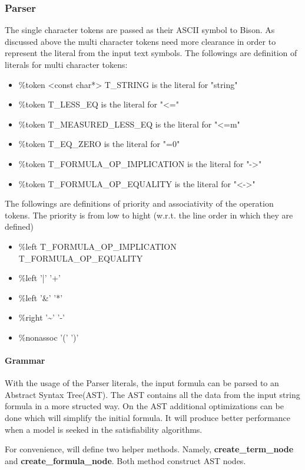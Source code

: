 \documentclass{article}
\begin{document}
	\subsubsection{Parser}
			The single character tokens are passed as their ASCII symbol to Bison. 
			As discussed above the multi character tokens need more clearance in order to represent the literal from the input text symbols.
			The followings are definition of literals for multi character tokens:
			\begin{itemize}
				\item \%token <const char*> T\_STRING is the literal for "string"
				\item \%token T\_LESS\_EQ is the literal for "<="
				\item \%token T\_MEASURED\_LESS\_EQ is the literal for "<=m"
				\item \%token T\_EQ\_ZERO is the literal for "=0"
				\item \%token T\_FORMULA\_OP\_IMPLICATION is the literal for "->"
				\item \%token T\_FORMULA\_OP\_EQUALITY is the literal for "<->"
			\end{itemize}
			The followings are definitions of priority and associativity of the operation tokens. 
			The priority is from low to hight (w.r.t. the line order in which they are defined)
			\begin{itemize}
				\item \%left T\_FORMULA\_OP\_IMPLICATION T\_FORMULA\_OP\_EQUALITY
				\item \%left '|' '+'
				\item \%left '\&' '*'
				\item \%right '\textasciitilde' '-'
				\item \%nonassoc '(' ')'
			\end{itemize}

		\paragraph{Grammar}
			With the usage of the Parser literals, the input formula can be parsed to an Abstract Syntax Tree(AST).
			The AST contains all the data from the input string formula in a more structed way.
			On the AST additional optimizations can be done which will simplify the initial formula. It will produce better performance when a model is seeked in the satisfiability algorithms.

			For convenience, will define two helper methods. Namely, \textbf{create\_term\_node} and \textbf{create\_formula\_node}. Both method construct AST nodes.
\end{document}
